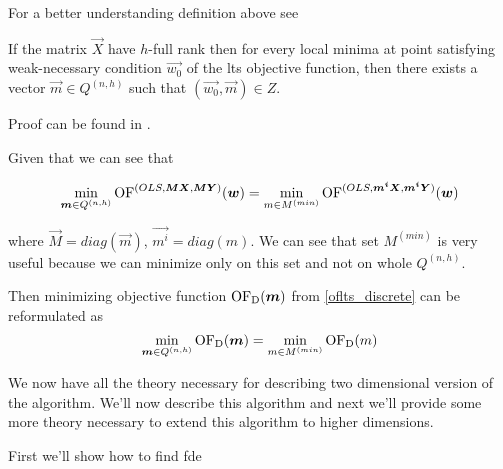 For a better understanding definition above see 

\begin{theorem}
	If the matrix $\vec{X}$ have $h$-full rank then for every local minima at point satisfying weak-necessary condition $\vec{w_{0}}$ of the lts objective function, then there exists a vector $\vec{m} \in Q^{(n,h)}$ such that $(\vec{w_{0}}, \vec{m}) \in Z$.
\end{theorem}

Proof can be found in \cite{klouda2015exact}. 

Given that we can see that 

\begin{equation}
	\operatorname*{min}_{\boldsymbol{m} \in Q^{(n,h)}} \operatorname{OF}^{(OLS, \boldsymbol{M}\boldsymbol{X}, \boldsymbol{M}\boldsymbol{Y})} (\boldsymbol{w}) =
	\operatorname*{min}_{m \in M^{(min)}} \operatorname{OF}^{(OLS, \boldsymbol{m^i}\boldsymbol{X}, \boldsymbol{m^i}\boldsymbol{Y})} (\boldsymbol{w})
\end{equation}

where $\vec{M} = diag(\vec{m})$, $\vec{m^i} = diag(m)$. We can see that set $M^{(min)}$ is very useful because we can minimize only on this set and not on whole $Q^{(n,h)}$.

Then minimizing objective function $\operatorname{OF_D}(\boldsymbol{m})$ from \ref{oflts_discrete} can be reformulated as 
\begin{equation}
	\operatorname*{min}_{\boldsymbol{m} \in Q^{(n,h)}}  \operatorname{OF_D}(\boldsymbol{m}) = \operatorname*{min}_{m \in M^{(min)}} \operatorname{OF_D}(m)
\end{equation}

We now have all the theory necessary for describing two dimensional version of the algorithm. We'll now describe this algorithm and next we'll provide some more theory necessary to extend this algorithm to higher dimensions.

First we'll show how to find fde
